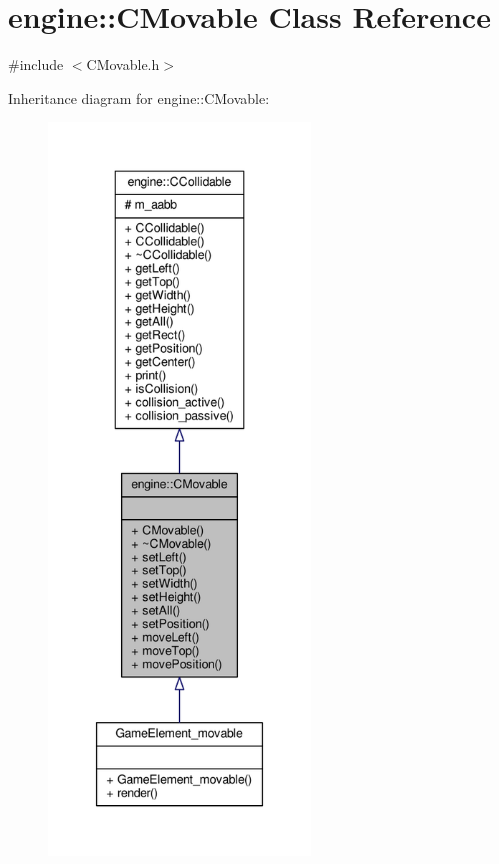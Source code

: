\hypertarget{classengine_1_1CMovable}{\section{engine\-:\-:C\-Movable Class Reference}
\label{classengine_1_1CMovable}
}


{\ttfamily \#include $<$C\-Movable.\-h$>$}



Inheritance diagram for engine\-:\-:C\-Movable\-:
\nopagebreak
\begin{figure}[H]
\begin{center}
\leavevmode
\includegraphics[height=550pt]{classengine_1_1CMovable__inherit__graph}
\end{center}
\end{figure}


